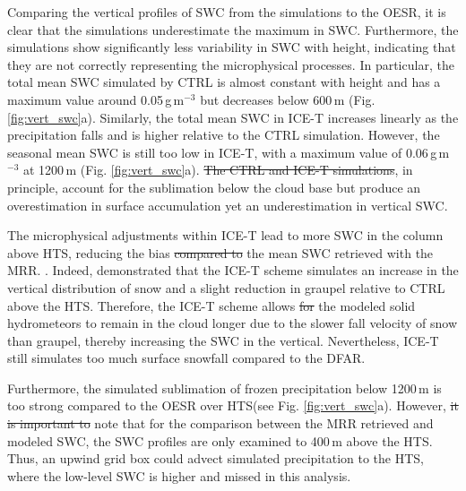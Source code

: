 \documentclass{ametsocV5}
\providecommand{\DIFadd}[1]{{\protect\color{blue}\uwave{#1}}} %
\providecommand{\DIFdel}[1]{{\protect\color{red}\sout{#1}}}                      %
\providecommand{\DIFaddbegin}{} %
\providecommand{\DIFaddend}{} %
\providecommand{\DIFdelbegin}{} %
\providecommand{\DIFdelend}{} %
\newcommand{\DIFscaledelfig}{0.5}
\newlength{\DIFdelgraphicswidth} %
\newlength{\DIFdelgraphicsheight} %
\newcommand{\DIFaddincludegraphics}[2][]{{\color{blue}\fbox{\DIFOincludegraphics[#1]{#2}}}} %
\newcommand{\DIFdelincludegraphics}[2][]{%
\sbox{\DIFdelgraphicsbox}{\DIFOincludegraphics[#1]{#2}}%
\settoboxwidth{\DIFdelgraphicswidth}{\DIFdelgraphicsbox} %
\settoboxtotalheight{\DIFdelgraphicsheight}{\DIFdelgraphicsbox} %
\scalebox{\DIFscaledelfig}{%
\parbox[b]{\DIFdelgraphicswidth}{\usebox{\DIFdelgraphicsbox}\\[-\baselineskip] \rule{\DIFdelgraphicswidth}{0em}}\llap{\resizebox{\DIFdelgraphicswidth}{\DIFdelgraphicsheight}{%
\setlength{\unitlength}{\DIFdelgraphicswidth}%
\begin{picture}(1,1)%
\thicklines\linethickness{2pt} %
{\color[rgb]{1,0,0}\put(0,0){\framebox(1,1){}}}%
{\color[rgb]{1,0,0}\put(0,0){\line( 1,1){1}}}%
{\color[rgb]{1,0,0}\put(0,1){\line(1,-1){1}}}%
\end{picture}%
}\hspace*{3pt}}} %
} %
\DeclareRobustCommand{\DIFaddbegin}{\DIFOaddbegin \let\includegraphics\DIFaddincludegraphics} %
\DeclareRobustCommand{\DIFaddend}{\DIFOaddend \let\includegraphics\DIFOincludegraphics} %
\DeclareRobustCommand{\DIFdelbegin}{\DIFOdelbegin \let\includegraphics\DIFdelincludegraphics} %
\DeclareRobustCommand{\DIFdelend}{\DIFOaddend \let\includegraphics\DIFOincludegraphics} %
\begin{document}
		Comparing the vertical profiles of SWC from the simulations to the OESR, it is clear that the simulations underestimate the maximum in SWC. Furthermore, the simulations show significantly less variability in SWC with height, indicating that they are not correctly representing the microphysical processes. In particular, the total mean SWC simulated by CTRL is almost constant with height and has a maximum value around 0.05\,g\,m$^{-3}$ but decreases below 600\,m (Fig. \ref{fig:vert_swc}a). Similarly, the total mean SWC in ICE-T increases linearly as the precipitation falls and is higher relative to the CTRL simulation. However, the seasonal mean SWC is still too low in ICE-T, with a maximum value of 0.06\,g\,m$^{-3}$ at 1200\,m (Fig. \ref{fig:vert_swc}a). \DIFdelbegin \DIFdel{The CTRL and ICE-T simulations}\DIFdelend \DIFaddbegin \DIFadd{Thus}\DIFaddend , in principle, \DIFaddbegin \DIFadd{the CTRL and ICE-T simulations }\DIFaddend account for the sublimation below the cloud base but produce an overestimation in surface accumulation yet an underestimation in vertical SWC. 

		The microphysical adjustments within ICE-T lead to more SWC in the column above HTS, reducing the bias \DIFdelbegin \DIFdel{compared to }\DIFdelend \DIFaddbegin \DIFadd{than }\DIFaddend the mean SWC retrieved with the MRR. \citep{engdahl_effects_2020}. Indeed, \citet{engdahl_effects_2020} demonstrated that the ICE-T scheme simulates an increase in the vertical distribution of snow and a slight reduction in graupel relative to CTRL above the HTS. Therefore, the ICE-T scheme allows \DIFdelbegin \DIFdel{for }\DIFdelend the modeled solid hydrometeors to remain in the cloud longer due to the slower fall velocity of snow than graupel, thereby increasing the SWC in the vertical. Nevertheless, ICE-T still simulates too much surface snowfall compared to the DFAR. 

		Furthermore, the simulated sublimation of frozen precipitation below 1200\,m is too strong compared to the OESR over HTS(see Fig. \ref{fig:vert_swc}a). However, \DIFdelbegin \DIFdel{it is important to }\DIFdelend \DIFaddbegin \DIFadd{kindly }\DIFaddend note that for the comparison between the MRR retrieved and modeled SWC, the SWC profiles are only examined to 400\,m above the HTS. Thus, an upwind grid box could advect simulated precipitation to the HTS, where the low-level SWC is higher and missed in this analysis.
\end{document}
